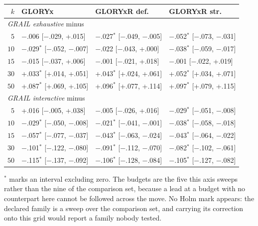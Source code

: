 \begin{table}[h]
\begin{threeparttable}
\vspace{5pt}

\begin{tabular}{rlll}
\toprule
$k$ & GLORYx & GLORYxR def. & GLORYxR str. \\
\midrule
\multicolumn{4}{l}{\emph{GRAIL exhaustive} minus} \\
$5$ & $-$.006\phantom{$^{*}$} [$-$.029, +.015] & $-$.027$^{*}$ [$-$.049, $-$.005] & $-$.052$^{*}$ [$-$.073, $-$.031] \\
$10$ & $-$.029$^{*}$ [$-$.052, $-$.007] & $-$.022\phantom{$^{*}$} [$-$.043, +.000] & $-$.038$^{*}$ [$-$.059, $-$.017] \\
$15$ & $-$.015\phantom{$^{*}$} [$-$.037, +.006] & $-$.001\phantom{$^{*}$} [$-$.021, +.018] & $-$.001\phantom{$^{*}$} [$-$.022, +.019] \\
$30$ & +.033$^{*}$ [+.014, +.051] & +.043$^{*}$ [+.024, +.061] & +.052$^{*}$ [+.034, +.071] \\
$50$ & +.087$^{*}$ [+.069, +.105] & +.096$^{*}$ [+.077, +.114] & +.097$^{*}$ [+.079, +.115] \\
\midrule
\multicolumn{4}{l}{\emph{GRAIL interactive} minus} \\
$5$ & +.016\phantom{$^{*}$} [$-$.005, +.038] & $-$.005\phantom{$^{*}$} [$-$.026, +.016] & $-$.029$^{*}$ [$-$.051, $-$.008] \\
$10$ & $-$.029$^{*}$ [$-$.050, $-$.008] & $-$.021$^{*}$ [$-$.041, $-$.001] & $-$.038$^{*}$ [$-$.058, $-$.018] \\
$15$ & $-$.057$^{*}$ [$-$.077, $-$.037] & $-$.043$^{*}$ [$-$.063, $-$.024] & $-$.043$^{*}$ [$-$.064, $-$.022] \\
$30$ & $-$.101$^{*}$ [$-$.122, $-$.080] & $-$.091$^{*}$ [$-$.112, $-$.070] & $-$.082$^{*}$ [$-$.102, $-$.061] \\
$50$ & $-$.115$^{*}$ [$-$.137, $-$.092] & $-$.106$^{*}$ [$-$.128, $-$.084] & $-$.105$^{*}$ [$-$.127, $-$.082] \\
\bottomrule
\end{tabular}
\begin{tablenotes}[flushleft]\footnotesize
\item $^{*}$ marks an interval excluding zero. The budgets are the five this axis sweeps rather than the nine of the comparison set, because a lead at a budget with no counterpart here cannot be followed across the move. No Holm mark appears: the declared family is a sweep over the comparison set, and carrying its correction onto this grid would report a family nobody tested.
\end{tablenotes}
\end{threeparttable}
\end{table}
